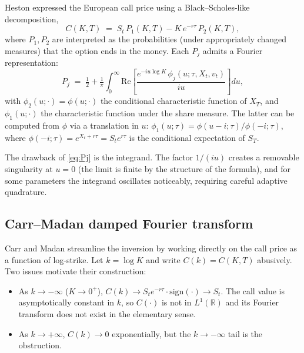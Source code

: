 \documentclass[11pt]{article}
\theoremstyle{plain}
\theoremstyle{definition}
\theoremstyle{remark}
\begin{document}
Heston \cite{Heston1993} expressed the European call price using a Black--Scholes-like decomposition,
\begin{equation}
    C(K, T) \;=\; S_t\, P_1(K, T) - K\, e^{-r\tau}\, P_2(K, T),                                       \label{eq:heston-P1P2}
\end{equation}
where \(P_1, P_2\) are interpreted as the probabilities (under appropriately changed measures) that the option ends in the money. Each \(P_j\) admits a Fourier representation:
\begin{equation}
    P_j \;=\; \tfrac12 + \tfrac{1}{\pi} \int_0^\infty \mathrm{Re}\!\left[\frac{e^{-i u \log K}\,\phi_j(u; \tau, X_t, v_t)}{i u}\right] du,                          \label{eq:Pj}
\end{equation}
with \(\phi_2(u; \cdot) = \phi(u; \cdot)\) the conditional characteristic function of \(X_T\), and \(\phi_1(u; \cdot)\) the characteristic function under the share measure. The latter can be computed from \(\phi\) via a translation in \(u\): \(\phi_1(u; \tau) = \phi(u - i; \tau)/\phi(-i; \tau)\), where \(\phi(-i; \tau) = e^{X_t + r \tau} = S_t e^{r\tau}\) is the conditional expectation of \(S_T\).

The drawback of \eqref{eq:Pj} is the integrand. The factor \(1/(iu)\) creates a removable singularity at \(u = 0\) (the limit is finite by the structure of the formula), and for some parameters the integrand oscillates noticeably, requiring careful adaptive quadrature.

\subsection{Carr--Madan damped Fourier transform}

Carr and Madan \cite{CarrMadan1999} streamline the inversion by working directly on the call price as a function of log-strike. Let \(k = \log K\) and write \(C(k) = C(K, T)\) abusively. Two issues motivate their construction:

\begin{itemize}[topsep=2pt]
    \item As \(k \to -\infty\) (\(K \to 0^+\)), \(C(k) \to S_t e^{-r\tau} \cdot \text{sign}(\cdot) \to S_t\). The call value is asymptotically constant in \(k\), so \(C(\cdot)\) is not in \(L^1(\mathbb{R})\) and its Fourier transform does not exist in the elementary sense.
    \item As \(k \to +\infty\), \(C(k) \to 0\) exponentially, but the \(k \to -\infty\) tail is the obstruction.
\end{itemize}
\end{document}
